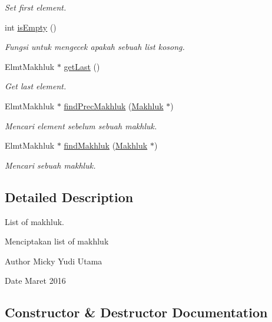 \begin{DoxyCompactItemize}
\begin{DoxyCompactList}\small\item\em Set first element. \end{DoxyCompactList}\item 
int \hyperlink{class_l_makhluk_a4ce8d0f4664716ac5237c2bd5bf0463e}{is\+Empty} ()
\begin{DoxyCompactList}\small\item\em Fungsi untuk mengecek apakah sebuah list kosong. \end{DoxyCompactList}\item 
Elmt\+Makhluk $\ast$ \hyperlink{class_l_makhluk_ac7bd40c1c06471b82f125000efa92add}{get\+Last} ()
\begin{DoxyCompactList}\small\item\em Get last element. \end{DoxyCompactList}\item 
Elmt\+Makhluk $\ast$ \hyperlink{class_l_makhluk_a11328333ff18d44b56eb3ff917340f64}{find\+Prec\+Makhluk} (\hyperlink{class_makhluk}{Makhluk} $\ast$)
\begin{DoxyCompactList}\small\item\em Mencari element sebelum sebuah makhluk. \end{DoxyCompactList}\item 
Elmt\+Makhluk $\ast$ \hyperlink{class_l_makhluk_a41073415d0c395c915ba47099aba7d69}{find\+Makhluk} (\hyperlink{class_makhluk}{Makhluk} $\ast$)
\begin{DoxyCompactList}\small\item\em Mencari sebuah makhluk. \end{DoxyCompactList}\end{DoxyCompactItemize}


\subsection{Detailed Description}
List of makhluk. 

Menciptakan list of makhluk \begin{DoxyAuthor}{Author}
Micky Yudi Utama 
\end{DoxyAuthor}
\begin{DoxyDate}{Date}
Maret 2016 
\end{DoxyDate}


\subsection{Constructor \& Destructor Documentation}
